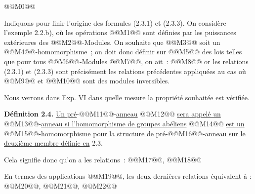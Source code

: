 
@@M0@@

Indiquons pour finir l'origine des formules (2.3.1) et (2.3.3). On considère l'exemple 2.2.b), où les opérations @@M1@@ sont définies par les puissances extérieures des @@M2@@-Modules. On souhaite que @@M3@@ soit un @@M4@@-homomorphisme~; on doit donc définir sur @@M5@@ des lois telles que pour tous @@M6@@-Modules @@M7@@, on ait~:
@@M8@@
or les relations (2.3.1) et (2.3.3) sont précisément les relations précédentes appliquées au cas où @@M9@@ et @@M10@@ sont des modules inversibles.

Nous verrons dans Exp. VI dans quelle mesure la propriété souhaitée est vérifiée.

\textbf{Définition 2.4.} \uline{Un pré}-@@M11@@-\uline{anneau} @@M12@@ \uline{sera appelé un} @@M13@@-\uline{anneau si l'homomorphisme de groupes abéliens} @@M14@@ \uline{est un} @@M15@@-\uline{homomorphisme} \uline{pour la structure de pré}-@@M16@@-\uline{anneau sur le deuxième membre définie en} 2.3.

Cela signifie donc qu'on a les relations~: @@M17@@,
@@M18@@

En termes des applications @@M19@@, les deux dernières relations équivalent à : @@M20@@, @@M21@@,
@@M22@@

